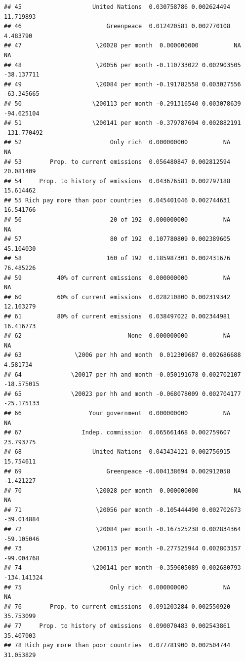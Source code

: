 \documentclass[a4paper,12pt]{article}\usepackage[]{graphicx}\usepackage[]{color}
\makeatletter
\newenvironment{kframe}{%
 \def\at@end@of@kframe{}%
 \ifinner\ifhmode%
  \def\at@end@of@kframe{\end{minipage}}%
  \begin{minipage}{\columnwidth}%
 \fi\fi%
 \def\FrameCommand##1{\hskip\@totalleftmargin \hskip-\fboxsep
 \colorbox{shadecolor}{##1}\hskip-\fboxsep
     \hskip-\linewidth \hskip-\@totalleftmargin \hskip\columnwidth}%
 \MakeFramed {\advance\hsize-\width
   \@totalleftmargin\z@ \linewidth\hsize
   \@setminipage}}%
 {\par\unskip\endMakeFramed%
 \at@end@of@kframe}
\newenvironment{knitrout}{}{} %
\makeatother
\begin{document}
\begin{knitrout}
\begin{kframe}
\begin{verbatim}
## 45                    United Nations  0.030758786 0.002624494   11.719893
## 46                        Greenpeace  0.012420581 0.002770108    4.483790
## 47                     \20028 per month  0.000000000          NA          NA
## 48                     \20056 per month -0.110733022 0.002903505  -38.137711
## 49                     \20084 per month -0.191782558 0.003027556  -63.345665
## 50                    \200113 per month -0.291316540 0.003078639  -94.625104
## 51                    \200141 per month -0.379787694 0.002882191 -131.770492
## 52                         Only rich  0.000000000          NA          NA
## 53        Prop. to current emissions  0.056480847 0.002812594   20.081409
## 54     Prop. to history of emissions  0.043676581 0.002797188   15.614462
## 55 Rich pay more than poor countries  0.045401046 0.002744631   16.541766
## 56                         20 of 192  0.000000000          NA          NA
## 57                         80 of 192  0.107780809 0.002389605   45.104030
## 58                        160 of 192  0.185987301 0.002431676   76.485226
## 59          40% of current emissions  0.000000000          NA          NA
## 60          60% of current emissions  0.028210800 0.002319342   12.163279
## 61          80% of current emissions  0.038497022 0.002344981   16.416773
## 62                              None  0.000000000          NA          NA
## 63               \2006 per hh and month  0.012309687 0.002686688    4.581734
## 64              \20017 per hh and month -0.050191678 0.002702107  -18.575015
## 65              \20023 per hh and month -0.068078009 0.002704177  -25.175133
## 66                   Your government  0.000000000          NA          NA
## 67                 Indep. commission  0.065661468 0.002759607   23.793775
## 68                    United Nations  0.043434121 0.002756915   15.754611
## 69                        Greenpeace -0.004138694 0.002912058   -1.421227
## 70                     \20028 per month  0.000000000          NA          NA
## 71                     \20056 per month -0.105444490 0.002702673  -39.014884
## 72                     \20084 per month -0.167525238 0.002834364  -59.105046
## 73                    \200113 per month -0.277525944 0.002803157  -99.004768
## 74                    \200141 per month -0.359605089 0.002680793 -134.141324
## 75                         Only rich  0.000000000          NA          NA
## 76        Prop. to current emissions  0.091203284 0.002550920   35.753099
## 77     Prop. to history of emissions  0.090070483 0.002543861   35.407003
## 78 Rich pay more than poor countries  0.077781900 0.002504744   31.053829

\end{verbatim}
\end{kframe}
\end{knitrout}
\end{document}
